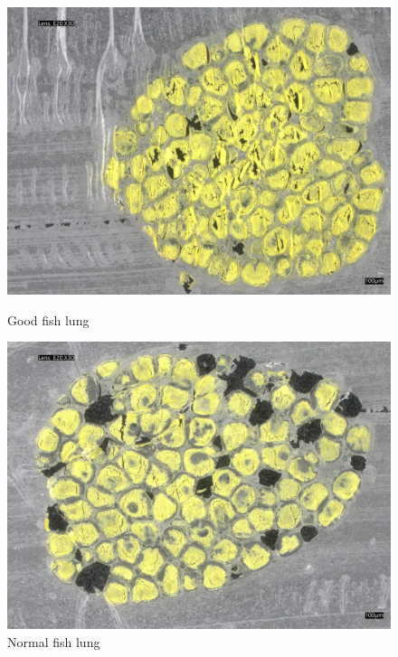\begin{figure}[H]
    \centering
    \begin{minipage}{0.24\textwidth}
        \centering
        \includegraphics[width=\textwidth]{./fig/fish_lung/good20240313_144138.jpg}
        \caption{Good fish lung}
        \label{fig:good_fish_lung}
    \end{minipage}
    \begin{minipage}{0.24\textwidth}
        \centering
        \includegraphics[width=\textwidth]{./fig/fish_lung/normal20240313_141726.jpg}
        \caption{Normal fish lung}
        \label{fig:noraml_fish_lung}
    \end{minipage}
    \begin{minipage}{0.24\textwidth}

\end{minipage}
\end{figure}

